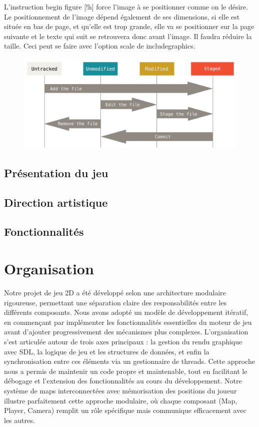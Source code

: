 \documentclass[12pt,a4paper, twoside]{article}
\begin{document}
    L’instruction \/begin figure [!h] force l’image à se positionner comme on le désire. Le positionnement de l’image dépend également de ses dimensions, si elle est située en bas de page, et qu’elle est trop grande, elle va se positionner sur la page suivante et le texte qui suit se retrouvera donc avant l’image. Il faudra réduire la taille. Ceci peut se faire avec l’option scale de includegraphics.


\begin{figure}[h]
    \centering
    \includegraphics[width=1\textwidth]{image.png}
    \label{fig:logo}
\end{figure}
\subsection{Présentation du jeu}
\subsection{Direction artistique}
\subsection{Fonctionnalités}
\newpage
\section{Organisation}
Notre projet de jeu 2D a été développé selon une architecture modulaire rigoureuse, permettant une séparation claire des responsabilités entre les différents composants. Nous avons adopté un modèle de développement itératif, en commençant par implémenter les fonctionnalités essentielles du moteur de jeu avant d'ajouter progressivement des mécanismes plus complexes. L'organisation s'est articulée autour de trois axes principaux : la gestion du rendu graphique avec SDL, la logique de jeu et les structures de données, et enfin la synchronisation entre ces éléments via un gestionnaire de threads. Cette approche nous a permis de maintenir un code propre et maintenable, tout en facilitant le débogage et l'extension des fonctionnalités au cours du développement. Notre système de maps interconnectées avec mémorisation des positions du joueur illustre parfaitement cette approche modulaire, où chaque composant (Map, Player, Camera) remplit un rôle spécifique mais communique efficacement avec les autres.
\end{document}
